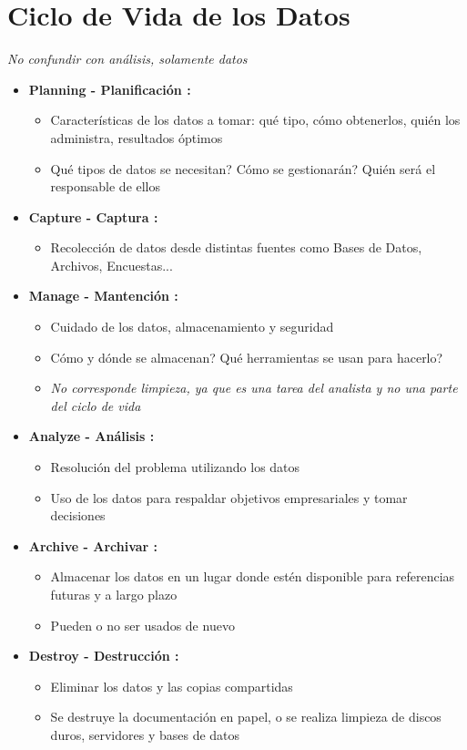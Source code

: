 \section{Ciclo de Vida de los Datos}

\textit{No confundir con análisis, solamente datos}

\begin{itemize}
    \item {\textbf{Planning - Planificación : }
    \begin{itemize}
        \item {Características de los datos a tomar: qué tipo, cómo obtenerlos, quién los administra, resultados óptimos}
        \item {Qué tipos de datos se necesitan? Cómo se gestionarán? Quién será el responsable de ellos}
    \end{itemize}}
    \item {\textbf{Capture - Captura : }
    \begin{itemize}
        \item {Recolección de datos desde distintas fuentes como Bases de Datos, Archivos, Encuestas...}
    \end{itemize}}
    \item {\textbf{Manage - Mantención : }
    \begin{itemize}
        \item {Cuidado de los datos, almacenamiento y seguridad}
        \item {Cómo y dónde se almacenan? Qué herramientas se usan para hacerlo?}
        \item {\textit{No corresponde limpieza, ya que es una tarea del analista y no una parte del ciclo de vida}}
    \end{itemize}}
    \item {\textbf{Analyze - Análisis : }
    \begin{itemize}
        \item {Resolución del problema utilizando los datos}
        \item {Uso de los datos para respaldar objetivos empresariales y tomar decisiones}
    \end{itemize}}
    \item {\textbf{Archive - Archivar : }
    \begin{itemize}
        \item {Almacenar los datos en un lugar donde estén disponible para referencias futuras y a largo plazo}
        \item {Pueden o no ser usados de nuevo}
    \end{itemize}}
    \item {\textbf{Destroy - Destrucción : }
    \begin{itemize}
       \item {Eliminar los datos y las copias compartidas}
       \item {Se destruye la documentación en papel, o se realiza limpieza de discos duros, servidores y bases de datos}
    \end{itemize}}
\end{itemize}

